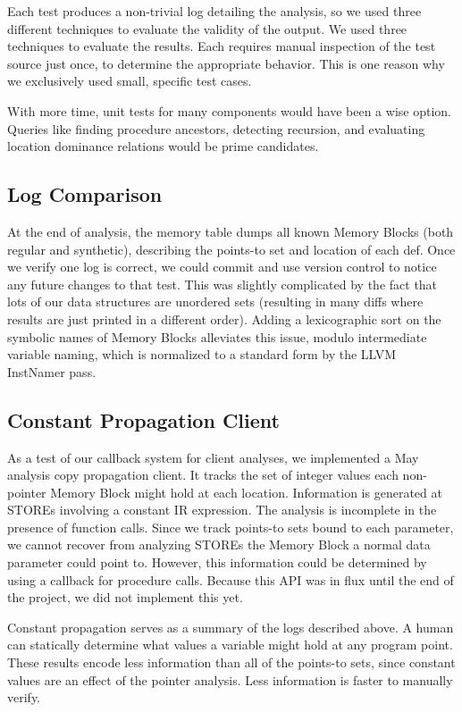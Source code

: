 Each test produces a non-trivial log detailing the analysis, so we used three
different techniques to evaluate the validity of the output.  We used three
techniques to evaluate the results. Each requires manual inspection of the test
source just once, to determine the appropriate behavior.  This is one reason why
we exclusively used small, specific test cases.

With more time, unit tests for many components would have been a wise option.
Queries like finding procedure ancestors, detecting recursion, and evaluating
location dominance relations would be prime candidates.

\subsection{Log Comparison}

At the end of analysis, the memory table dumps all known Memory Blocks (both
regular and synthetic), describing the points-to set and location of each def.
Once we verify one log is correct, we could commit and use version control to
notice any future changes to that test. This was slightly complicated by the
fact that lots of our data structures are unordered sets (resulting in many
diffs where results are just printed in a different order). Adding a
lexicographic sort on the symbolic names of Memory Blocks alleviates this issue,
modulo intermediate variable naming, which is normalized to a standard form 
by the LLVM InstNamer pass.

\subsection{Constant Propagation Client}

As a test of our callback system for client analyses, we implemented a May
analysis copy propagation client. It tracks the set of integer values each
non-pointer Memory Block might hold at each location. Information is generated
at STOREs involving a constant IR expression. The analysis is incomplete in the
presence of function calls. Since we track points-to sets bound to each
parameter, we cannot recover from analyzing STOREs the Memory Block a normal
data parameter could point to. However, this information could be determined by
using a callback for procedure calls. Because this API was in flux until the end
of the project, we did not implement this yet.

Constant propagation serves as a summary of the logs described above. A human
can statically determine what values a variable might hold at any program point.
These results encode less information than all of the points-to sets, since
constant values are an effect of the pointer analysis. Less information is
faster to manually verify.


